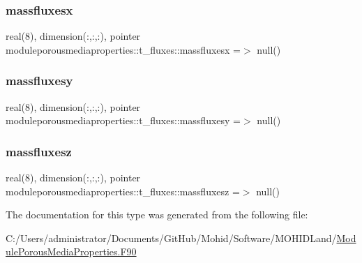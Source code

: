 \subsubsection{\texorpdfstring{massfluxesx}{massfluxesx}}
{\footnotesize\ttfamily real(8), dimension(\+:,\+:,\+:), pointer moduleporousmediaproperties\+::t\+\_\+fluxes\+::massfluxesx =$>$ null()\hspace{0.3cm}{\ttfamily [private]}}

\mbox{\label{structmoduleporousmediaproperties_1_1t__fluxes_af045032f114b7dc00fa1f3f54f49b727}} 
\subsubsection{\texorpdfstring{massfluxesy}{massfluxesy}}
{\footnotesize\ttfamily real(8), dimension(\+:,\+:,\+:), pointer moduleporousmediaproperties\+::t\+\_\+fluxes\+::massfluxesy =$>$ null()\hspace{0.3cm}{\ttfamily [private]}}

\mbox{\label{structmoduleporousmediaproperties_1_1t__fluxes_a00320f19cfc1450f86dc96a1036f0707}} 
\subsubsection{\texorpdfstring{massfluxesz}{massfluxesz}}
{\footnotesize\ttfamily real(8), dimension(\+:,\+:,\+:), pointer moduleporousmediaproperties\+::t\+\_\+fluxes\+::massfluxesz =$>$ null()\hspace{0.3cm}{\ttfamily [private]}}



The documentation for this type was generated from the following file\+:\begin{DoxyCompactItemize}
\item 
C\+:/\+Users/administrator/\+Documents/\+Git\+Hub/\+Mohid/\+Software/\+M\+O\+H\+I\+D\+Land/\mbox{\hyperlink{_module_porous_media_properties_8_f90}{Module\+Porous\+Media\+Properties.\+F90}}\end{DoxyCompactItemize}
